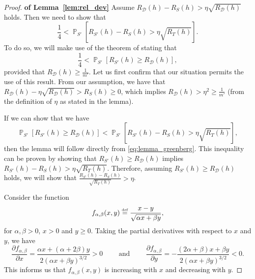 \documentclass[twoside,11pt]{article}
\newcommand{\D}{\mathcal{D}}
\newcommand{\eqdef}{\overset{\smash{\mbox{\tiny \rm def}}}{=}}
\DeclareMathOperator*{\Prob}{\mathds{P}}
\newcommand{\prob}[2]{\Prob_{#1}\left[#2\right]}
\begin{document}
\begin{proof} \hspace{-4pt}\textbf{of Lemma~\ref{lem:rel_dev}}
Assume $R_\D(h) - R_S(h) > \eta \sqrt{R_\D(h)}$ holds.
Then we need to show that
\begin{equation*}
    \frac{1}{4} < \prob{S'}{R_{S'}(h) - R_S(h) > \eta \sqrt{R_T(h)}}.
\end{equation*}
To do so, we will make use of the theorem of \cite{greenberg14} stating that \begin{equation}
    \frac{1}{4} < \prob{S'}{R_{S'}(h) \ge R_\D(h)},\label{eq:lemma_greenberg}
\end{equation}
provided that $R_\D(h) \ge \frac{1}{m'}$.
Let us first confirm that our situation permits the use of this result.
From our assumption, we have that $R_\D(h) - \eta \sqrt{R_\D(h)} > R_S(h) \ge 0$, which implies $R_\D(h) > \eta^2 \ge \frac{1}{m'}$ (from the definition of $\eta$ as stated in the lemma).

If we can show that we have
\begin{equation*}
    \prob{S'}{R_{S'}(h) \ge R_\D(h)} < \prob{S'}{R_{S'}(h) - R_S(h) > \eta \sqrt{R_T(h)}},
\end{equation*}
then the lemma will follow directly from \eqref{eq:lemma_greenberg}.
This inequality can be proven by showing that $R_{S'}(h) \ge R_\D(h)$ implies $R_{S'}(h) - R_S(h) > \eta \sqrt{R_T(h)}$.
Therefore, assuming $R_{S'}(h) \ge R_\D(h)$ holds, we will show that $\frac{R_{S'}(h) - R_S(h)}{\sqrt{R_T(h)}} > \eta$.

Consider the function
\begin{equation*}
    f_{\alpha, \beta}(x, y) \eqdef \frac{x - y}{\sqrt{\alpha x + \beta y}},
\end{equation*}
for $\alpha, \beta > 0$, $x > 0$ and $y \ge 0$.
Taking the partial derivatives with respect to $x$ and $y$, we have
\begin{equation*}
    \frac{\partial f_{\alpha, \beta}}{\partial x} = \frac{\alpha x + (\alpha+2\beta)y}{2(\alpha x + \beta y)^{3/2}} > 0
    \qquad \text{ and } \qquad
    \frac{\partial f_{\alpha, \beta}}{\partial y} = -\frac{(2\alpha + \beta) x + \beta y}{2(\alpha x + \beta y)^{3/2}} < 0.
\end{equation*}
This informs us that $f_{\alpha, \beta}(x,y)$ is increasing with $x$ and decreasing with $y$.


\end{proof}
\end{document}
